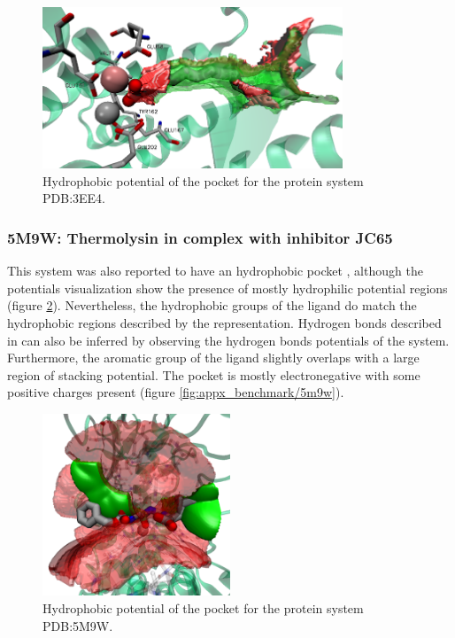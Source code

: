       \begin{figure}[H]
        \centering
        \includegraphics[width=0.8\textwidth]{figures/results/benchmark_prot/3ee4.png}
        \caption{\label{fig:benchmark/3ee4} Hydrophobic potential of the pocket for the protein system PDB:3EE4.}
      \end{figure}

    \subsubsection{5M9W: Thermolysin in complex with inhibitor JC65}
      This system was also reported to have an hydrophobic pocket \cite{hydrophobic_2017}, although the potentials visualization show the presence of mostly hydrophilic potential regions (figure \ref{fig:benchmark/5m9w}). Nevertheless, the hydrophobic groups of the ligand do match the hydrophobic regions described by the representation. Hydrogen bonds described in \cite{hydrophobic_2017} can also be inferred by observing the hydrogen bonds potentials of the system. Furthermore, the aromatic group of the ligand slightly overlaps with a large region of stacking potential. The pocket is mostly electronegative with some positive charges present (figure \ref{fig:appx_benchmark/5m9w}).

      \begin{figure}[H]
        \centering
        \includegraphics[width=0.5\textwidth]{figures/results/benchmark_prot/5m9w.png}
        \caption{\label{fig:benchmark/5m9w} Hydrophobic potential of the pocket for the protein system PDB:5M9W.}
      \end{figure}

